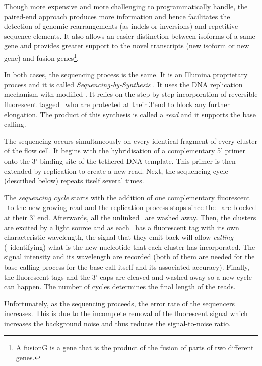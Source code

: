 Though more expensive and more challenging to programmatically handle,
the paired-end approach produces more information and hence facilitates
the detection of genomic rearrangements (as indels or inversions) and
repetitive sequence elements.
It also allows an easier distinction between isoforms of a same gene and provides
greater support to the novel transcripts (new isoform or new gene) and fusion
genes\footnote{A \gls{fusionG} is a gene that is the product of the fusion of
parts of two different genes.}.

In both cases, the sequencing process is the same. It is an Illumina proprietary
process and it is called \emph{Sequencing-by-Synthesis} .
It uses the \gls{DNA} replication mechanism with modified \dNTPs.
It relies on the step-by-step incorporation of
reversible fluorescent tagged \dNTPs\ who are protected at
their 3'end to block any further elongation.
The product of this synthesis is called a \emph{read} and it supports the base
calling.

The sequencing occurs simultaneously on every identical fragment
of every cluster of the flow cell.
It begins with the hybridisation of a complementary 5' primer onto the 3' binding
site of the tethered \gls{DNA} template. This primer is then extended by
replication to create a new read. Next, the sequencing cycle (described below)
repeats itself several times.

The \emph{sequencing cycle} starts with the addition of one complementary
fluorescent \dNTP\ to the new growing read and
the replication process stops since the \dNTPs\ are blocked at their 3' end.
Afterwards, all the unlinked
\dNTPs\ are washed away. Then, the clusters are excited by a light source
and as each
\dNTPs\ has a fluorescent tag with its own characteristic wavelength, the
signal that they emit back will allow \emph{calling} (\ie\ identifying) what is the
new nucleotide that each cluster has incorporated. The signal intensity and
its wavelength are recorded (both of them are needed for the base calling
process for the base call itself and its associated accuracy). Finally,
the fluorescent tags and the 3' caps are cleaved
and washed away so a new cycle can happen.
The number of cycles determines the final length of the reads.

Unfortunately, as the sequencing proceeds, the error rate of the sequencers
increases. This is due to the incomplete removal of the fluorescent signal which
increases the background noise and thus reduces the signal-to-noise ratio.

